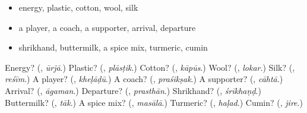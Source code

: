 \begin{itemize}
\raggedright
  \item energy, plastic, cotton, wool, silk
  \item a player, a coach, a supporter, arrival, departure
  \item shrikhand, buttermilk, a spice mix, turmeric, cumin
\end{itemize}

\begin{tcolorbox}[breakable,colback=teal!4,colframe=teal!35!black,title={Before you move on}]
Energy? (\textbf{}, \emph{ūrjā}.) Plastic? (\textbf{}, \emph{plāsṭik}.) Cotton? (\textbf{}, \emph{kāpūs}.) Wool? (\textbf{}, \emph{lokar}.) Silk? (\textbf{}, \emph{reśīm}.) A player? (\textbf{}, \emph{kheḷāḍū}.) A coach? (\textbf{}, \emph{praśikṣak}.) A supporter? (\textbf{}, \emph{cāhtā}.) Arrival? (\textbf{}, \emph{āgaman}.) Departure? (\textbf{}, \emph{prasthān}.) Shrikhand? (\textbf{}, \emph{śrīkhaṇḍ}.) Buttermilk? (\textbf{}, \emph{tāk}.) A spice mix? (\textbf{}, \emph{masālā}.) Turmeric? (\textbf{}, \emph{haḷad}.) Cumin? (\textbf{}, \emph{jire}.)
\end{tcolorbox}
